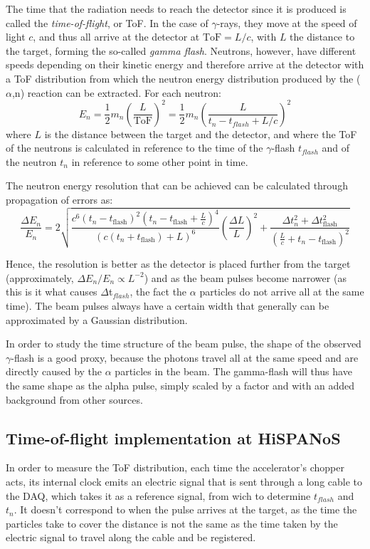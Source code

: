 \documentclass[a4paper,12pt]{report}
\newcommand{\an}{($\alpha$,n) }
\begin{document}
The time that the radiation needs to reach the detector since it is produced is called the \textit{time-of-flight}, or ToF.
In the case of $\gamma$-rays, they move at the speed of light $c$, and thus all arrive at the detector at $\text{ToF}=L/c$, with $L$ the distance to the target, forming the so-called  \textit{gamma flash}.
Neutrons, however, have different speeds depending on their kinetic energy and therefore arrive at the detector with a ToF distribution from which the neutron energy distribution produced by the \an reaction can be extracted.
For each neutron:
\begin{equation}
	E_n=\frac{1}{2} m_n \left( \frac{L}{\text{ToF}} \right)^2 = \frac{1}{2} m_n \left( \frac{L}{t_n - t_{flash} + L/c} \right)^2
	\label{Eq_ToF2En}
\end{equation}
where $L$ is the distance between the target and the detector, and where the ToF of the neutrons is calculated in reference to the time of the $\gamma$-flash $t_{flash}$ and of the neutron $t_n$ in reference to some other point in time.

The neutron energy resolution that can be achieved can be calculated through propagation of errors as:
\begin{equation}
    \frac{\Delta E_n}{E_n} =
    2\sqrt{\frac{c^6\left(t_n-t_\text{flash}\right)^2\left(t_n-t_\text{flash}+\frac{L}{c}\right)^4}{\left(c\left(t_n+t_\text{flash}\right)+L\right)^6}\left(\frac{\Delta L}{L}\right)^2 + \frac{\Delta t_n^2 + \Delta t_\text{flash}^2}{{\left(\frac{L}{c}+t_n-t_\text{flash}\right)}^2}}
    \label{Eq_Enresolution}
\end{equation}

Hence, the resolution is better as the detector is placed further from the target (approximately, $\Delta E_n/E_n \propto L^{-2}$) and as the beam pulses become narrower (as this is it what causes  $\Delta$t$_{flash}$, the fact the $\alpha$ particles do not arrive all at the same time).
The beam pulses always have a certain width that generally can be approximated by a Gaussian distribution.

In order to study the time structure of the beam pulse, the shape of the observed $\gamma$-flash is a good proxy, because the photons travel all at the same speed and are directly caused by the $\alpha$ particles in the beam.
The gamma-flash will thus have the same shape as the alpha pulse, simply scaled by a factor and with an added background from other sources.

\subsection{Time-of-flight implementation at HiSPANoS} 
In order to measure the ToF distribution, each time the accelerator's chopper acts, its internal clock emits an electric signal that is sent through a long cable to the DAQ, which takes it as a reference signal, from wich to determine $t_{flash}$ and $t_n$.
It doesn't correspond to when the pulse arrives at the target, as the time the particles take to cover the distance is not the same as the time taken by the electric signal to travel along the cable and be registered.
\end{document}
